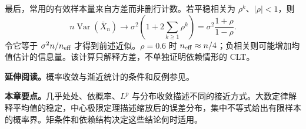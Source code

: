 最后，常用的有效样本量来自方差而非删行计数。若平稳相关为 $\rho^k$、$|\rho|<1$，则
\[
 n\operatorname{Var}(\bar X_n)\longrightarrow
 \sigma^2\left(1+2\sum_{k\geq1}\rho^k\right)
 =\sigma^2\frac{1+\rho}{1-\rho}.
\]
令它等于 $\sigma^2n/n_{\rm eff}$ 才得到前述近似。$\rho=0.6$ 时 $n_{\rm eff}\approx n/4$；负相关则可能增加均值估计的信息量。该计算只解释方差，不单独证明依赖情形的 CLT。

\noindent\textbf{延伸阅读。}概率收敛与渐近统计的条件和反例参见\cite{billingsley1999convergence,vanderVaart1998asymptotic}。




\noindent\textbf{本章要点。}几乎处处、依概率、$L^p$ 与分布收敛描述不同的接近方式。大数定律解释平均值的稳定，中心极限定理描述缩放后的误差分布，集中不等式给出有限样本的概率界。矩条件和依赖结构决定这些结论何时适用。